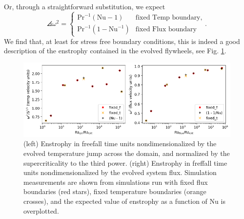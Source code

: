 Or, through a straightforward substitution, we expect
\begin{equation}
\angles{\omega^2} = 
\begin{cases}
\text{Pr}^{-1} (\text{Nu} - 1)  & \text{fixed Temp boundary}, \\
\text{Pr}^{-1} (1 - \text{Nu}^{-1}) & \text{fixed Flux boundary}
\end{cases}.
\end{equation}
We find that, at least for stress free boundary conditions, this is indeed a good description of the enstrophy contained in the evolved flywheels, see Fig. \ref{fig:enstrophy}.

\begin{figure}
    \includegraphics[width=\columnwidth]{figs/unpublished/enstrophy_v_ra.pdf}
    \caption{
	(left) Enstrophy in freefall time units nondimensionalized by the evolved temperature jump across the domain, and normalized by the supercriticality to the third power.
	(right) Enstrophy in freffall time units nondimensionalized by the evolved system flux.
	Simulation measurements are shown from simulations run with fixed flux boundaries (red stars), fixed temperature boundaries (orange crosses), and the expected value of enstrophy as a function of Nu is overplotted.
    \label{fig:enstrophy} }
\end{figure}


